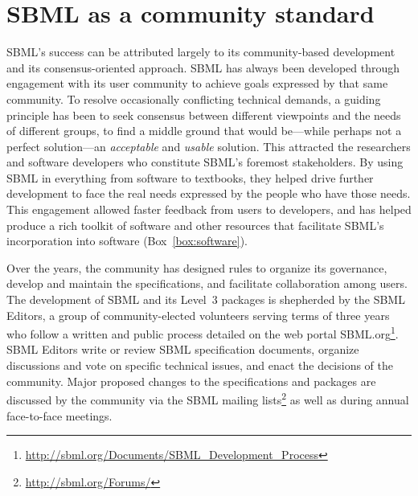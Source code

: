 \documentclass{sbml-paper}
\begin{document}
\hrulefill

\newpage
\section*{SBML as a community standard}

SBML's success can be attributed largely to its community-based development and its consensus-oriented approach. SBML has always been developed through engagement with its user community to achieve goals expressed by that same community. To resolve occasionally conflicting technical demands, a guiding principle has been to seek consensus between different viewpoints and the needs of different groups, to find a middle ground that would be---while perhaps not a perfect solution---an \emph{acceptable} and \emph{usable} solution. This attracted the researchers and software developers who constitute SBML's foremost stakeholders. By using SBML in everything from software to textbooks, they helped drive further development to face the real needs expressed by the people who have those needs.  This engagement allowed faster feedback from users to developers, and has helped produce a rich toolkit of software and other resources that facilitate SBML's incorporation into software (Box~\ref{box:software}).

Over the years, the community has designed rules to organize its governance, develop and maintain the specifications, and facilitate collaboration among users.  The development of SBML and its Level~3 packages is shepherded by the SBML Editors, a group of community-elected volunteers serving terms of three years who follow a written and public process detailed on the web portal SBML.org\footnote{\url{http://sbml.org/Documents/SBML_Development_Process}}.  SBML Editors write or review SBML specification documents, organize discussions and vote on specific technical issues, and enact the decisions of the community.  Major proposed changes to the specifications and packages are discussed by the community via the SBML mailing lists\footnote{\url{http://sbml.org/Forums/}} as well as during annual face-to-face meetings.  
\end{document}
